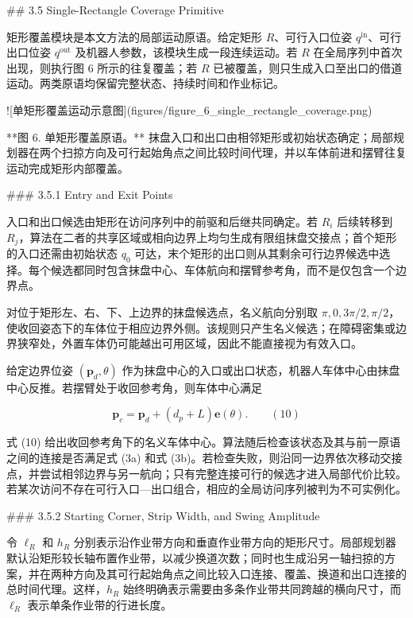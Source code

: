 ## 3.5 Single-Rectangle Coverage Primitive

  

矩形覆盖模块是本文方法的局部运动原语。给定矩形 $R$、可行入口位姿 $q^{\mathrm{in}}$、可行出口位姿 $q^{\mathrm{out}}$ 及机器人参数，该模块生成一段连续运动。若 $R$ 在全局序列中首次出现，则执行图 6 所示的往复覆盖；若 $R$ 已被覆盖，则只生成入口至出口的借道运动。两类原语均保留完整状态、持续时间和作业标记。

![单矩形覆盖运动示意图](figures/figure_6_single_rectangle_coverage.png)

**图 6. 单矩形覆盖原语。** 抹盘入口和出口由相邻矩形或初始状态确定；局部规划器在两个扫掠方向及可行起始角点之间比较时间代理，并以车体前进和摆臂往复运动完成矩形内部覆盖。

  

### 3.5.1 Entry and Exit Points

  

入口和出口候选由矩形在访问序列中的前驱和后继共同确定。若 $R_i$ 后续转移到 $R_j$，算法在二者的共享区域或相向边界上均匀生成有限组抹盘交接点；首个矩形的入口还需由初始状态 $q_0$ 可达，末个矩形的出口则从其剩余可行边界候选中选择。每个候选都同时包含抹盘中心、车体航向和摆臂参考角，而不是仅包含一个边界点。

  

对位于矩形左、右、下、上边界的抹盘候选点，名义航向分别取 $\pi,0,3\pi/2,\pi/2$，使收回姿态下的车体位于相应边界外侧。该规则只产生名义候选；在障碍密集或边界狭窄处，外置车体仍可能越出可用区域，因此不能直接视为有效入口。

  

给定边界位姿 $(\mathbf p_d,\theta)$ 作为抹盘中心的入口或出口状态，机器人车体中心由抹盘中心反推。若摆臂处于收回参考角，则车体中心满足

  

$$
\mathbf p_c
=\mathbf p_d+(d_p+L)\mathbf e(\theta).
\qquad(10)
$$

  

式 (10) 给出收回参考角下的名义车体中心。算法随后检查该状态及其与前一原语之间的连接是否满足式 (3a) 和式 (3b)。若检查失败，则沿同一边界依次移动交接点，并尝试相邻边界与另一航向；只有完整连接可行的候选才进入局部代价比较。若某次访问不存在可行入口—出口组合，相应的全局访问序列被判为不可实例化。


  

### 3.5.2 Starting Corner, Strip Width, and Swing Amplitude

  

令 $\ell_R$ 和 $h_R$ 分别表示沿作业带方向和垂直作业带方向的矩形尺寸。局部规划器默认沿矩形较长轴布置作业带，以减少换道次数；同时也生成沿另一轴扫掠的方案，并在两种方向及其可行起始角点之间比较入口连接、覆盖、换道和出口连接的总时间代理。这样，$h_R$ 始终明确表示需要由多条作业带共同跨越的横向尺寸，而 $\ell_R$ 表示单条作业带的行进长度。

